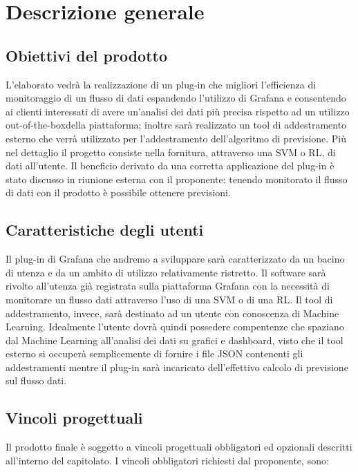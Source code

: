 \section{Descrizione generale}
   
	\subsection{Obiettivi del prodotto}
	L’elaborato vedrà la realizzazione di un plug-in che migliori l’efficienza di monitoraggio di un flusso di dati espandendo l’utilizzo di Grafana e consentendo ai clienti interessati di avere un’analisi dei dati più precisa rispetto ad un utilizzo out-of-the-box\glo della piattaforma; inoltre sarà realizzato un tool di addestramento esterno che verrà utilizzato per l'addestramento dell'algoritmo di previsione. Più nel dettaglio il progetto consiste nella fornitura, attraverso una SVM o RL, di dati all’utente. Il beneficio derivato da una corretta applicazione del plug-in è stato discusso in riunione esterna con il proponente: tenendo monitorato il flusso di dati con il prodotto è possibile ottenere previsioni. 
	\subsection{Caratteristiche degli utenti}
	Il plug-in di Grafana che andremo a sviluppare sarà caratterizzato da un bacino di utenza e da un ambito di utilizzo relativamente ristretto.
Il software sarà rivolto all’utenza già registrata sulla piattaforma Grafana con la necessità di monitorare un flusso dati attraverso l’uso di una SVM o di una RL. Il tool di addestramento, invece, sarà destinato ad un utente con conoscenza di Machine Learning. Idealmente l'utente dovrà quindi possedere compentenze che spaziano dal Machine Learning all'analisi dei dati su grafici e dashboard, visto che il tool esterno si occuperà semplicemente di fornire i file JSON contenenti gli addestramenti mentre il plug-in sarà incaricato dell'effettivo calcolo di previsione sul flusso dati.


	 \subsection{Vincoli progettuali}
	 Il prodotto finale è soggetto a vincoli progettuali obbligatori ed opzionali descritti all’interno del capitolato. I vincoli obbligatori richiesti dal proponente, sono:

